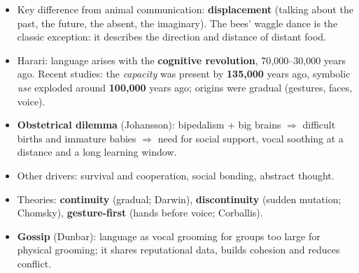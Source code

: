 \begin{nbsummary}
\begin{itemize}[nosep]
  \item Key difference from animal communication: \textbf{displacement} (talking about
        the past, the future, the absent, the imaginary). The bees' waggle dance is the
        classic exception: it describes the direction and distance of distant food.
  \item Harari: language arises with the \textbf{cognitive revolution},
        70{,}000--30{,}000 years ago. Recent studies: the \emph{capacity} was present by
        \textbf{135{,}000} years ago, symbolic \emph{use} exploded around
        \textbf{100{,}000} years ago; origins were gradual (gestures, faces, voice).
  \item \textbf{Obstetrical dilemma} (Johansson): bipedalism + big brains
        $\Rightarrow$ difficult births and immature babies $\Rightarrow$ need for social
        support, vocal soothing at a distance and a long learning window.
  \item Other drivers: survival and cooperation, social bonding, abstract thought.
  \item Theories: \textbf{continuity} (gradual; Darwin), \textbf{discontinuity}
        (sudden mutation; Chomsky), \textbf{gesture-first} (hands before voice;
        Corballis).
  \item \textbf{Gossip} (Dunbar): language as vocal grooming for groups too large for
        physical grooming; it shares reputational data, builds cohesion and reduces
        conflict.
\end{itemize}
\end{nbsummary}
